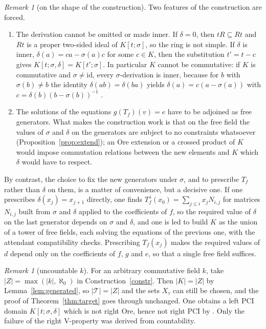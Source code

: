 \documentclass[11pt]{amsart}
\theoremstyle{plain}
\theoremstyle{definition}
\theoremstyle{remark}
\newtheorem{remark}[theorem]{Remark}
\newcommand{\id}{\mathrm{id}}
\newcommand{\T}{\mathcal T}
\begin{document}
\begin{remark}[on the shape of the construction]
Two features of the construction are forced.
\begin{enumerate}
\item The derivation cannot be omitted or made inner. If $\delta=0$, then $tR\subseteq Rt$ and $Rt$ is a proper two-sided ideal of $K[t;\sigma]$, so the ring is not simple. If $\delta$ is inner, $\delta(a)=ca-\sigma(a)c$ for some $c\in K$, then the substitution $t'=t-c$ gives $K[t;\sigma,\delta]=K[t';\sigma]$. In particular $K$ cannot be commutative: if $K$ is commutative and $\sigma\ne\id$, every $\sigma$-derivation is inner, because for $b$ with $\sigma(b)\ne b$ the identity $\delta(ab)=\delta(ba)$ yields $\delta(a)=c(a-\sigma(a))$ with $c=\delta(b)(b-\sigma(b))^{-1}$ \cite[\S2]{Coh77}.
\item The solutions of the equations $g(T_f)(v)=e$ have to be adjoined as free generators. What makes the construction work is that on the free field the values of $\sigma$ and $\delta$ on the generators are subject to no constraints whatsoever (Proposition~\ref{prop:extend}); an Ore extension or a crossed product of $K$ would impose commutation relations between the new elements and $K$ which $\delta$ would have to respect.
\end{enumerate}
By contrast, the choice to fix the new generators under $\sigma$, and to prescribe $T_f$ rather than $\delta$ on them, is a matter of convenience, but a decisive one. If one prescribes $\delta(x_j)=x_{j+1}$ directly, one finds $T_f^{\,i}(x_0)=\sum_{j\le i}x_jN_{i,j}$ for matrices $N_{i,j}$ built from $\sigma$ and $\delta$ applied to the coefficients of $f$, so the required value of $\delta$ on the last generator depends on $\sigma$ and $\delta$, and one is led to build $K$ as the union of a tower of free fields, each solving the equations of the previous one, with the attendant compatibility checks. Prescribing $T_f(x_j)$ makes the required values of $d$ depend only on the coefficients of $f$, $g$ and $e$, so that a single free field suffices.
\end{remark}

\begin{remark}[uncountable $k$]
For an arbitrary commutative field $k$, take $|Z|=\max(|k|,\aleph_0)$ in Construction~\ref{constr}. Then $|K|=|Z|$ by Lemma~\ref{lem:generated}, so $|\T|=|Z|$ and the sets $X_\tau$ can still be chosen, and the proof of Theorem~\ref{thm:target} goes through unchanged. One obtains a left PCI domain $K[t;\sigma,\delta]$ which is not right Ore, hence not right PCI by \cite[6.17]{CF75}. Only the failure of the right V-property was derived from countability.
\end{remark}
\end{document}
